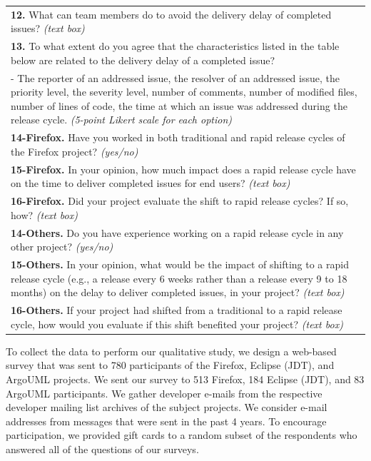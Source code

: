 \begin{table}[t!]
\begin{tabular}{p{}}
			\hline 
			\textbf{12.} What can team members do to avoid the delivery delay of completed
			issues? {\em (text box)}\tabularnewline
			\textbf{13.} To what extent do you agree that the characteristics listed in
			the table below are related to the delivery delay of a
			completed issue?\\
			- The reporter of an addressed issue, the resolver of an
			addressed issue, the priority level, the severity level,
			number of comments, number of modified files, number of
			lines of code, the time at which an issue was addressed
			during the release cycle.
			{\em (5-point Likert scale for each option)}\tabularnewline
			\hline 
			\textbf{14-Firefox.} Have you worked in both traditional and rapid release cycles of
			the Firefox project? {\em (yes/no)}\tabularnewline
			\textbf{15-Firefox.} In your opinion, how much impact does a rapid release cycle have
			on the time to deliver completed issues for end users?
			{\em (text box)}\tabularnewline
			\textbf{16-Firefox.} Did your project evaluate the shift to rapid release cycles? If
			so, how? {\em (text box)}\tabularnewline
			\textbf{14-Others.} Do you have experience working on a
			rapid release cycle in any other project? {\em (yes/no)}\tabularnewline
			\textbf{15-Others.} In your opinion, what would be the
			impact of shifting to a rapid release cycle (e.g., a
			release every 6 weeks rather than a release every 9 to
			18 months) on the delay to deliver completed issues, in
			your project? {\em (text box)}\tabularnewline
			\textbf{16-Others.} If your project had shifted from a
			traditional to a rapid release cycle, how would you
			evaluate if this shift benefited your project? {\em (text box)}
		\end{tabular}
\end{table}

To collect the data to perform our qualitative study, we design a web-based
survey that was sent to 780 participants of the Firefox, Eclipse (JDT), and
ArgoUML projects. We sent our survey to 513 Firefox, 184 Eclipse (JDT), and 83
ArgoUML participants. We gather developer e-mails from the respective
developer mailing list archives of the subject projects. We consider e-mail
addresses from messages that were sent in the past 4 years. To
encourage participation, we provided gift cards to a random subset of the
respondents who answered all of the questions of our surveys.

